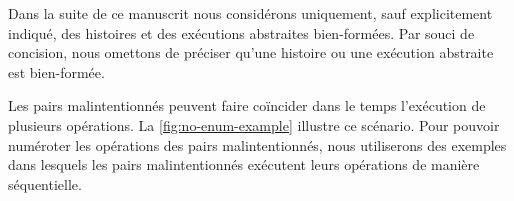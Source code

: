 \begin{remark}
Dans la suite de ce manuscrit nous considérons uniquement, sauf explicitement indiqué, des histoires et des exécutions abstraites bien-formées.
Par souci de concision, nous omettons de préciser qu'une histoire ou une exécution abstraite est bien-formée.
\end{remark}

Les pairs malintentionnés peuvent faire coïncider dans le temps l'exécution de plusieurs opérations.
La \autoref{fig:no-enum-example} illustre ce scénario.
Pour pouvoir numéroter les opérations des pairs malintentionnés, nous utiliserons des exemples dans lesquels les pairs malintentionnés exécutent leurs opérations de manière séquentielle.

